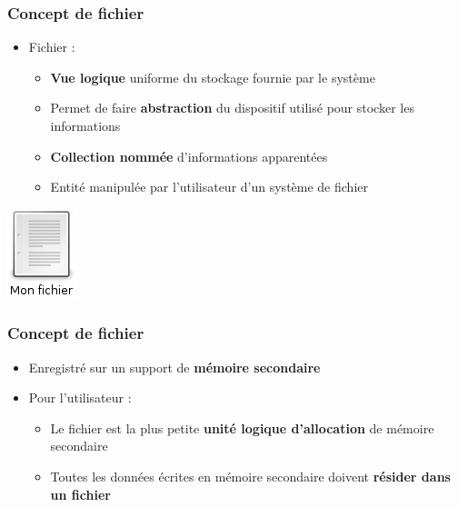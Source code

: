 \begin{frame}
\frametitle{Concept de fichier}
\begin{itemize}
\item Fichier :
\begin{itemize}
\item \textbf{Vue logique} uniforme du stockage fournie par le système
\item Permet de faire \textbf{abstraction} du dispositif utilisé pour stocker les informations
\item \textbf{Collection nommée} d'informations apparentées
\item Entité manipulée par l'utilisateur d'un système de fichier
\end{itemize}
\end{itemize}
\includegraphics[scale=.5]{../illustration/fichier.png} 
\end{frame}

\begin{frame}
\frametitle{Concept de fichier}
\begin{itemize}
\item Enregistré sur un support de \textbf{mémoire secondaire}
\item Pour l'utilisateur :
\begin{itemize}
\item Le fichier est la plus petite \textbf{unité logique d'allocation} de mémoire secondaire
\item Toutes les données écrites en mémoire secondaire doivent \textbf{résider dans un fichier}
\end{itemize}
\end{itemize}
\end{frame}

